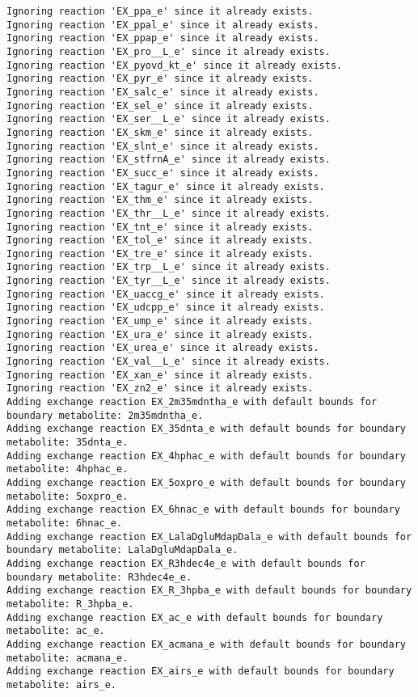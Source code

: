 \documentclass[
  letterpaper,
  DIV=11,
  numbers=noendperiod]{scrartcl}
\begin{document}
\begin{verbatim}
Ignoring reaction 'EX_ppa_e' since it already exists.
Ignoring reaction 'EX_ppal_e' since it already exists.
Ignoring reaction 'EX_ppap_e' since it already exists.
Ignoring reaction 'EX_pro__L_e' since it already exists.
Ignoring reaction 'EX_pyovd_kt_e' since it already exists.
Ignoring reaction 'EX_pyr_e' since it already exists.
Ignoring reaction 'EX_salc_e' since it already exists.
Ignoring reaction 'EX_sel_e' since it already exists.
Ignoring reaction 'EX_ser__L_e' since it already exists.
Ignoring reaction 'EX_skm_e' since it already exists.
Ignoring reaction 'EX_slnt_e' since it already exists.
Ignoring reaction 'EX_stfrnA_e' since it already exists.
Ignoring reaction 'EX_succ_e' since it already exists.
Ignoring reaction 'EX_tagur_e' since it already exists.
Ignoring reaction 'EX_thm_e' since it already exists.
Ignoring reaction 'EX_thr__L_e' since it already exists.
Ignoring reaction 'EX_tnt_e' since it already exists.
Ignoring reaction 'EX_tol_e' since it already exists.
Ignoring reaction 'EX_tre_e' since it already exists.
Ignoring reaction 'EX_trp__L_e' since it already exists.
Ignoring reaction 'EX_tyr__L_e' since it already exists.
Ignoring reaction 'EX_uaccg_e' since it already exists.
Ignoring reaction 'EX_udcpp_e' since it already exists.
Ignoring reaction 'EX_ump_e' since it already exists.
Ignoring reaction 'EX_ura_e' since it already exists.
Ignoring reaction 'EX_urea_e' since it already exists.
Ignoring reaction 'EX_val__L_e' since it already exists.
Ignoring reaction 'EX_xan_e' since it already exists.
Ignoring reaction 'EX_zn2_e' since it already exists.
Adding exchange reaction EX_2m35mdntha_e with default bounds for boundary metabolite: 2m35mdntha_e.
Adding exchange reaction EX_35dnta_e with default bounds for boundary metabolite: 35dnta_e.
Adding exchange reaction EX_4hphac_e with default bounds for boundary metabolite: 4hphac_e.
Adding exchange reaction EX_5oxpro_e with default bounds for boundary metabolite: 5oxpro_e.
Adding exchange reaction EX_6hnac_e with default bounds for boundary metabolite: 6hnac_e.
Adding exchange reaction EX_LalaDgluMdapDala_e with default bounds for boundary metabolite: LalaDgluMdapDala_e.
Adding exchange reaction EX_R3hdec4e_e with default bounds for boundary metabolite: R3hdec4e_e.
Adding exchange reaction EX_R_3hpba_e with default bounds for boundary metabolite: R_3hpba_e.
Adding exchange reaction EX_ac_e with default bounds for boundary metabolite: ac_e.
Adding exchange reaction EX_acmana_e with default bounds for boundary metabolite: acmana_e.
Adding exchange reaction EX_airs_e with default bounds for boundary metabolite: airs_e.

\end{verbatim}
\end{document}
